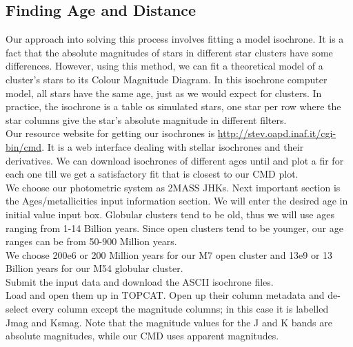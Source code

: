 \documentclass[12pt, twocolumn]{aastex62}
\begin{document}
	\subsection{Finding Age and Distance}
	Our approach into solving this process involves fitting a model isochrone. It is a fact that the absolute magnitudes of stars in different star clusters have some differences. However, using this method, we can fit a theoretical model of a cluster's stars to its Colour Magnitude Diagram. In this isochrone computer model, all stars have the same age, just as we would expect for clusters. In practice, the isochrone is a table os simulated stars, one star per row where the star columns give the star's absolute magnitude in different filters.\\
	Our resource website for getting our isochrones is \url{http://stev.oapd.inaf.it/cgi-bin/cmd}. It is a web interface dealing with stellar isochrones and their derivatives. We can download isochrones of different ages until and plot a fir for each one till we get a satisfactory fit that is closest to our CMD plot.\\
	We choose our photometric system as 2MASS JHKs. Next important section is the Ages/metallicities input information section. We will enter the desired age in initial value input box. Globular clusters tend to be old, thus we will use ages ranging from 1-14 Billion years. Since open clusters tend to be younger, our age ranges can be from 50-900 Million years.\\
	We choose 200e6 or 200 Million years for our M7 open cluster and 13e9 or 13 Billion years for our M54 globular cluster.\\
	Submit the input data and download the ASCII isochrone files.\\
	Load and open them up in TOPCAT. Open up their column metadata and de-select every column except the magnitude columns; in this case it is labelled Jmag and Ksmag. Note that the magnitude values for the J and K bands are absolute magnitudes, while our CMD uses apparent magnitudes.
\end{document}
